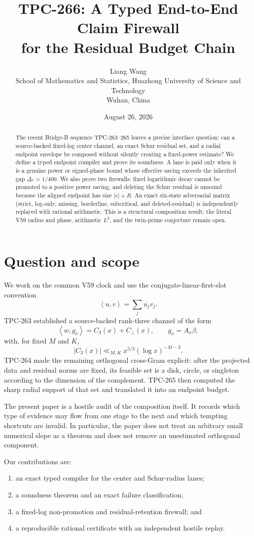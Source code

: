 \documentclass[11pt]{article}
\title{TPC-266: A Typed End-to-End Claim Firewall\\
for the Residual Budget Chain}
\author{Liang Wang\\
School of Mathematics and Statistics, Huazhong University of Science and Technology\\
Wuhan, China}
\date{August 26, 2026}
\theoremstyle{definition}
\newcommand{\ip}[2]{\left\langle #1,#2\right\rangle}
\begin{document}
\maketitle

\begin{abstract}
The recent Bridge-B sequence TPC-263--265 leaves a precise interface question:
can a source-backed fixed-log center channel, an exact Schur residual set, and
a radial endpoint envelope be composed without silently creating a
fixed-power estimate?  We define a typed endpoint compiler and prove its
soundness.  A lane is paid only when it is a genuine power or signed-phase
bound whose effective saving exceeds the inherited gap
$\Delta_*=1/400$.  We also prove two firewalls: fixed logarithmic decay cannot
be promoted to a positive power saving, and deleting the Schur residual is
unsound because the aligned endpoint has size $|c|+R$.  An exact six-state
adversarial matrix (strict, log-only, missing, borderline, subcritical, and
deleted-residual) is independently replayed with rational arithmetic.  This
is a structural composition result; the literal V59 radius and phase,
arithmetic $L^2$, and the twin-prime conjecture remain open.
\end{abstract}

\section{Question and scope}

We work on the common V59 clock and use the conjugate-linear-first-slot
convention
\[
 \ip{u}{v}=\sum_j\overline{u_j}v_j.
\]
TPC-263 established a source-backed rank-three channel of the form
\[
 \ip{w}{g_x}=C_3(x)+C_\perp(x), \qquad g_x=A_x\beta,
\]
with, for fixed $M$ and $K$,
\[
 |C_3(x)|\ll_{M,K}x^{5/3}(\log x)^{-M-3}.
\]
TPC-264 made the remaining orthogonal cross-Gram explicit: after the
projected data and residual norms are fixed, its feasible set is a disk,
circle, or singleton according to the dimension of the complement.  TPC-265
then computed the sharp radial support of that set and translated it into an
endpoint budget.

The present paper is a hostile audit of the composition itself.  It records
which type of evidence may flow from one stage to the next and which tempting
shortcuts are invalid.  In particular, the paper does not treat an arbitrary
small numerical slope as a theorem and does not remove an unestimated
orthogonal component.

Our contributions are:
\begin{enumerate}
 \item an exact typed compiler for the center and Schur-radius lanes;
 \item a soundness theorem and an exact failure classification;
 \item a fixed-log non-promotion and residual-retention firewall; and
 \item a reproducible rational certificate with an independent hostile replay.
\end{enumerate}
\end{document}
